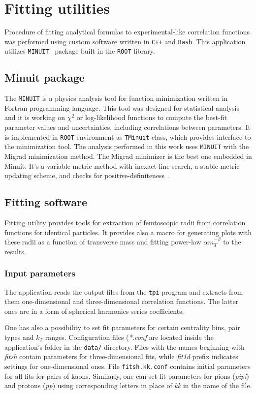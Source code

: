 %
\chapter{Fitting utilities}
\label{a:b}
  Procedure of fitting analytical formulas to experimental-like correlation functions was performed using custom software written in \verb|C++| and \verb|Bash|.
  This application utilizes \verb|MINUIT|~\cite{minuit} package built in the \verb|ROOT| library.
  \section{Minuit package}
    The \verb|MINUIT| is a physics analysis tool for function minimization written in Fortran programming language.
    This tool was designed for statistical analysis and it is working on $\chi^2$ or log-likelihood functions to compute the best-fit parameter values and uncertainties, including correlations between parameters.
    It is implemented in \verb|ROOT| environment as \verb|TMinuit| class, which provides interface to the minimization tool.
    The analysis performed in this work uses \verb|MINUIT| with the Migrad minimization method.
    The Migrad minimizer is the best one embedded in Minuit.
    It's a variable-metric method with inexact line search, a stable metric updating scheme, and checks for positive-definiteness~\cite{minuit}.
  \section{Fitting software}
    Fitting utility provides tools for extraction of femtoscopic radii from correlation functions for identical particles.
    It provides also a macro for generating plots with these radii as a function of transverse mass and fitting power-law $\alpha m_T^{-\beta}$ to the results.
    \subsection{Input parameters}
      The application reads the output files from the \verb|tpi| program and extracts from them one-dimensional and three-dimensional correlation functions.
      The latter ones are in a form of spherical harmonics series coefficients.

      One has also a possibility to set fit parameters for certain centrality bins, pair types and $k_T$ ranges.
      Configuration files (\textit{*.conf} are located inside the application's folder in the \verb|data/| directory.
      Files with the names beginning with \textit{fitsh} contain parameters for three-dimensional fits, while \textit{fit1d} prefix indicates settings for one-dimensional ones.
      File \verb|fitsh.kk.conf| contains initial parameters for all fits for pairs of kaons.
      Similarly, one can set fit parameters for pions (\textit{pipi}) and protons (\textit{pp}) using corresponding letters in place of \textit{kk} in the name of the file.

